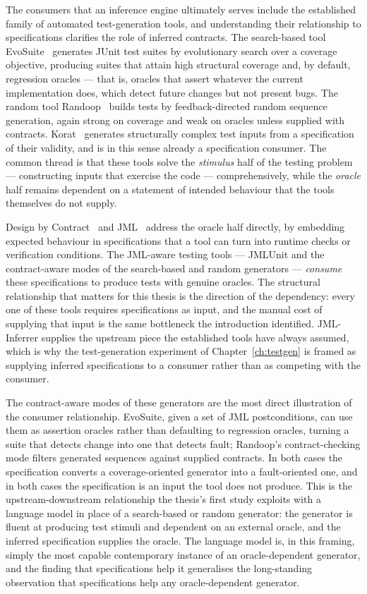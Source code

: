 The consumers that an inference engine ultimately serves include the
established family of automated test-generation tools, and understanding their
relationship to specifications clarifies the role of inferred contracts. The
search-based tool EvoSuite~\cite{fraser2011evosuite} generates JUnit test
suites by evolutionary search over a coverage objective, producing suites that
attain high structural coverage and, by default, regression oracles --- that
is, oracles that assert whatever the current implementation does, which detect
future changes but not present bugs. The random tool
Randoop~\cite{pacheco2007randoop} builds tests by feedback-directed random
sequence generation, again strong on coverage and weak on oracles unless
supplied with contracts. Korat~\cite{boyapati2002korat} generates structurally
complex test inputs from a specification of their validity, and is in this sense
already a specification consumer. The common thread is that these tools solve
the \emph{stimulus} half of the testing problem --- constructing inputs that
exercise the code --- comprehensively, while the \emph{oracle} half remains
dependent on a statement of intended behaviour that the tools themselves do not
supply.

Design by Contract~\cite{meyer1992design} and JML~\cite{jml, leavens2006design}
address the oracle half directly, by embedding expected behaviour in
specifications that a tool can turn into runtime checks or verification
conditions. The JML-aware testing tools --- JMLUnit and the contract-aware modes
of the search-based and random generators --- \emph{consume} these
specifications to produce tests with genuine oracles. The structural
relationship that matters for this thesis is the direction of the dependency:
every one of these tools requires specifications as input, and the manual cost
of supplying that input is the same bottleneck the introduction identified.
JML-Inferrer supplies the upstream piece the established tools have always
assumed, which is why the test-generation experiment of
Chapter~\ref{ch:testgen} is framed as supplying inferred specifications to a
consumer rather than as competing with the consumer.

The contract-aware modes of these generators are the most direct illustration of
the consumer relationship. EvoSuite, given a set of JML postconditions, can use
them as assertion oracles rather than defaulting to regression oracles, turning a
suite that detects change into one that detects fault; Randoop's contract-checking
mode filters generated sequences against supplied contracts. In both cases the
specification converts a coverage-oriented generator into a fault-oriented one, and
in both cases the specification is an input the tool does not produce. This is the
upstream-downstream relationship the thesis's first study exploits with a language
model in place of a search-based or random generator: the generator is fluent at
producing test stimuli and dependent on an external oracle, and the inferred
specification supplies the oracle. The language model is, in this framing, simply
the most capable contemporary instance of an oracle-dependent generator, and the
finding that specifications help it generalises the long-standing observation that
specifications help any oracle-dependent generator.

